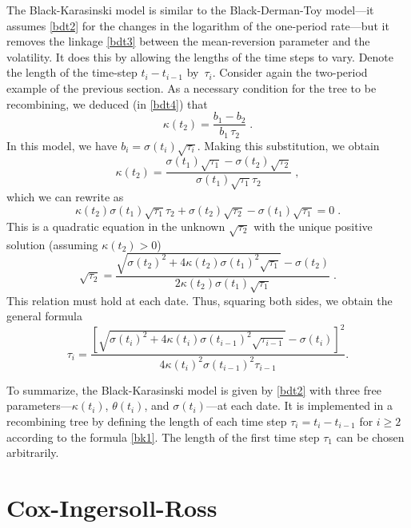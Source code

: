 The Black-Karasinski \cite{BK} model is similar to the Black-Derman-Toy model---it assumes  \eqref{bdt2} for the changes in the logarithm of the one-period rate---but it removes the linkage \eqref{bdt3} between the mean-reversion parameter and the volatility.  It does this by allowing the lengths of the time steps to vary. Denote the length of the time-step $t_i-t_{i-1}$ by~$\tau_i$.  Consider again the two-period example of the previous section.  As a necessary condition for the tree to be recombining, we deduced (in  \eqref{bdt4}) that
$$\kappa(t_2) = \frac{b_1-b_2}{b_1\,\tau_2}\; .$$
In this model, we have $b_i = \sigma(t_i)\sqrt{\tau_i}$.  Making this substitution, we obtain
$$\kappa(t_2) = \frac{\sigma(t_1)\sqrt{\tau_1} - \sigma(t_2)\sqrt{\tau_2}}{\sigma(t_1)\sqrt{\tau_1}\tau_2}\; ,$$
which we can rewrite as
$$\kappa(t_2)\sigma(t_1)\sqrt{\tau_1}\tau_2 + \sigma(t_2)\sqrt{\tau_2} - \sigma(t_1)\sqrt{\tau_1} = 0\; .$$
This is a quadratic equation in the unknown $\sqrt{\tau_2}$ with the unique positive solution (assuming $\kappa(t_2)>0$)
$$\sqrt{\tau_2} = \frac{\sqrt{\sigma(t_2)^2 + 4\kappa(t_2)\sigma(t_1)^2\sqrt{\tau_1}} - \sigma(t_2)}{2\kappa(t_2)\sigma(t_1)\sqrt{\tau_1}}\; .$$
This relation must hold at each date.  Thus, squaring both sides, we obtain the general formula
\begin{equation}\label{bk1}
\tau_i = \frac{\left[\sqrt{\sigma(t_i)^2 + 4\kappa(t_i)\sigma(t_{i-1})^2\sqrt{\tau_{i-1}}} - \sigma(t_i)\right]^2}{4\kappa(t_i)^2\sigma(t_{i-1})^2 \tau_{i-1}}.
\end{equation}

To summarize, the Black-Karasinski model is given by  \eqref{bdt2} with three free parameters---$\kappa(t_i)$, $\theta(t_i)$, and $\sigma(t_i)$---at each date.  It is implemented in a recombining tree by defining the length of each time step $\tau_i = t_i-t_{i-1}$ for $i \geq 2$ according to the formula \eqref{bk1}.  The length of the first time step $\tau_1$ can be chosen arbitrarily.



\section{Cox-Ingersoll-Ross}\label{s_cir}




